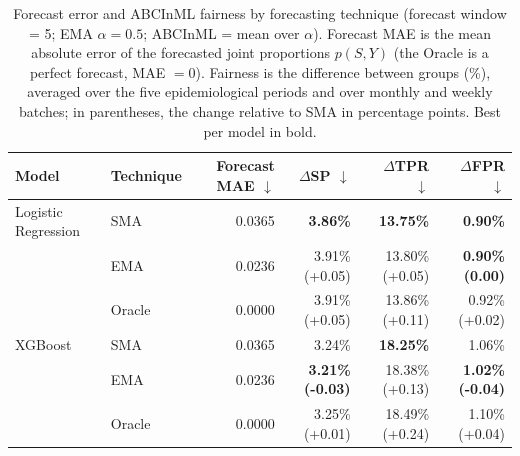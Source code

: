 \begin{table}
  \small
  \caption{Forecast error and ABCInML fairness by forecasting technique (forecast window = 5; EMA $\alpha=0.5$; ABCInML = mean over $\alpha$). Forecast MAE is the mean absolute error of the forecasted joint proportions $p(S,Y)$ (the Oracle is a perfect forecast, MAE $=0$). Fairness is the difference between groups (\%), averaged over the five epidemiological periods and over monthly and weekly batches; in parentheses, the change relative to SMA in percentage points. Best per model in bold.}
  \label{tab:forecast-error-fairness}
  \begin{tabular}{llrrrr}
    \toprule
    Model & Technique & Forecast MAE $\downarrow$ & $\Delta$SP $\downarrow$ & $\Delta$TPR $\downarrow$ & $\Delta$FPR $\downarrow$ \\
    \midrule
    Logistic Regression & SMA & 0.0365 & \textbf{3.86\%} & \textbf{13.75\%} & \textbf{0.90\%} \\
     & EMA & 0.0236 & 3.91\% (+0.05) & 13.80\% (+0.05) & \textbf{0.90\% (0.00)} \\
     & Oracle & 0.0000 & 3.91\% (+0.05) & 13.86\% (+0.11) & 0.92\% (+0.02) \\
    \midrule
    XGBoost & SMA & 0.0365 & 3.24\% & \textbf{18.25\%} & 1.06\% \\
     & EMA & 0.0236 & \textbf{3.21\% (-0.03)} & 18.38\% (+0.13) & \textbf{1.02\% (-0.04)} \\
     & Oracle & 0.0000 & 3.25\% (+0.01) & 18.49\% (+0.24) & 1.10\% (+0.04) \\
    \bottomrule
  \end{tabular}
\end{table}
